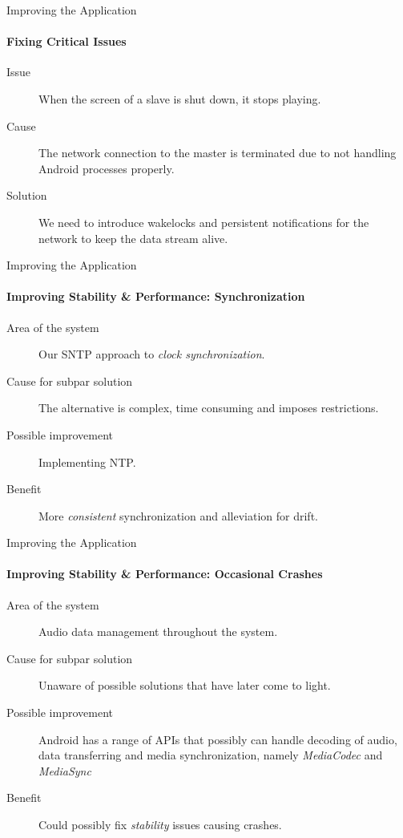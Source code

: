 \begin{frame}{Improving the Application}
    \framesubtitle{Fixing Critical Issues}
    \begin{description}
        \item [Issue] When the screen of a slave is shut down, it stops playing.
        \item [Cause] The network connection to the master is terminated due to not handling Android processes properly.
        \item [Solution] We need to introduce wakelocks and persistent notifications for the network to keep the data stream alive.
    \end{description}
\end{frame}

\begin{frame}{Improving the Application}
    \framesubtitle{Improving Stability \& Performance: Synchronization}
    \begin{description}
        \item [Area of the system] Our SNTP approach to \textit{clock synchronization}.
        \item [Cause for subpar solution] The alternative is complex, time consuming and imposes restrictions.
        \item [Possible improvement] Implementing NTP.
        \item [Benefit] More \textit{consistent} synchronization and alleviation for drift.
    \end{description}
\end{frame}

\begin{frame}{Improving the Application}
    \framesubtitle{Improving Stability \& Performance: Occasional Crashes}
    \begin{description}
        \item [Area of the system] Audio data management throughout the system.
        \item [Cause for subpar solution] Unaware of possible solutions that have later come to light.
        \item [Possible improvement] Android has a range of APIs that possibly can handle decoding of audio, data transferring and media synchronization, namely \textit{MediaCodec} and \textit{MediaSync}
        \item [Benefit] Could possibly fix \textit{stability} issues causing crashes.
    \end{description}
\end{frame}

